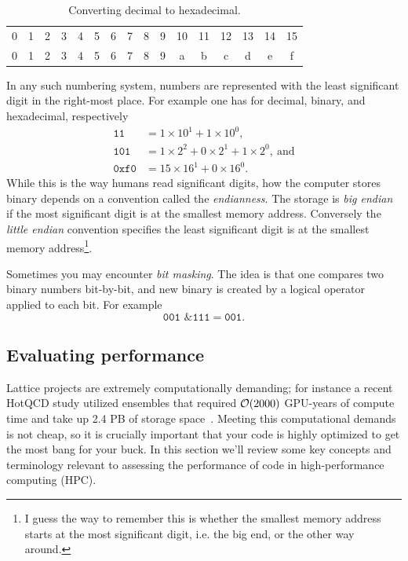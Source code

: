 \begin{table}
\centering
\caption{Converting decimal to hexadecimal.}
\begin{tabularx}{\linewidth}{CCCCCCCCCCCCCCCC}
\hline{} & 1 & 2 & 3 & 4 & 5 & 6 & 7 & 8 & 9 & 10 & 11 & 12 & 13 & 14 & 15\\
0 & 1 & 2 & 3 & 4 & 5 & 6 & 7 & 8 & 9 & a & b & c & d & e & f\\
\hline\hline
\end{tabularx}
\label{tab:hexadecimal}
\end{table}

In any such numbering system, numbers are represented with the least significant
digit in the right-most place. For example one has for decimal, binary, and
hexadecimal, respectively
\begin{equation*}\begin{aligned}
  \texttt{11} &= 1\times10^1+1\times10^0, \\
  \texttt{101} &= 1\times2^2+0\times2^1+1\times2^0,~\text{and} \\
  \texttt{0xf0} &= 15\times16^1+0\times16^0.
\end{aligned}\end{equation*}
While this is the way humans read significant digits, how the computer stores
binary depends on a convention called the {\it endianness}.
The storage is {\it big endian}  if the most significant digit 
is at the smallest memory address. Conversely the
{\it little endian}  convention specifies the least
significant digit is at the smallest memory address\footnote{I guess the way
to remember this is whether the smallest memory address starts at the most
significant digit, i.e. the big end, or the other way around.}.

Sometimes you may encounter {\it bit masking}. The idea is that one compares
two binary numbers bit-by-bit, and new binary is created by a logical operator
applied to each bit. For example
\begin{equation*}
  \texttt{001 \& 111} = \texttt{001}. 
\end{equation*}


\subsection{Evaluating performance}

Lattice projects are extremely computationally demanding; for instance
a recent HotQCD study utilized ensembles that required
$\order{2000}$ GPU-years of compute time and take up 2.4 PB of storage 
space~\cite{Bollweg:2021vqf}. Meeting this computational demands is
not cheap, so it is crucially important that your code is highly
optimized to get the most bang for your buck.
In this section we'll review some key concepts and terminology
relevant to assessing the performance of code
in high-performance computing (HPC). 

